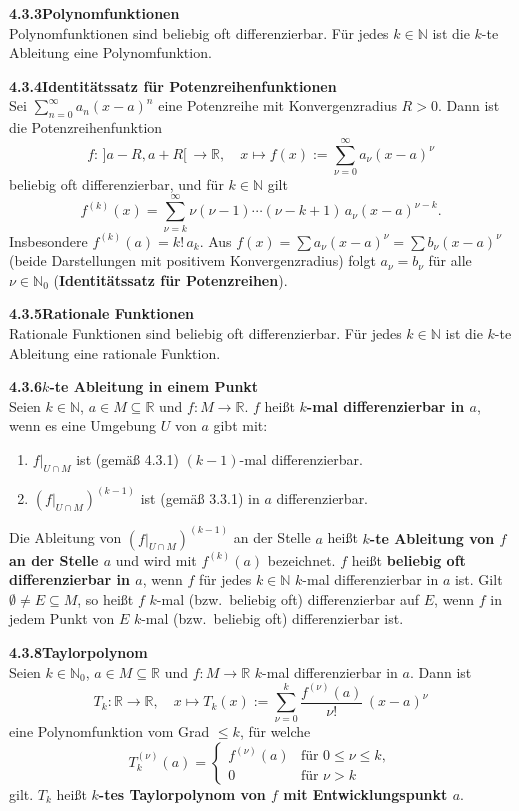 \documentclass[a4paper,12pt]{article}
\newcommand{\gentry}[3]{%
  \noindent\textbf{#1\quad #2}\nopagebreak\\[0.2em]
  #3\par\smallskip
}
\begin{document}
\gentry{4.3.3}{Polynomfunktionen}{%
  Polynomfunktionen sind beliebig oft differenzierbar. Für jedes $k \in \mathbb{N}$ ist die
  $k$-te Ableitung eine Polynomfunktion.
}

\gentry{4.3.4}{Identitätssatz für Potenzreihenfunktionen}{%
  Sei $\sum_{n=0}^{\infty} a_n (x-a)^n$ eine Potenzreihe mit Konvergenzradius $R > 0$. Dann
  ist die Potenzreihenfunktion
  \[
    f: \,]a-R, a+R[\, \to \mathbb{R}, \quad x \mapsto f(x) := \sum_{\nu=0}^{\infty} a_\nu (x-a)^\nu
  \]
  beliebig oft differenzierbar, und für $k \in \mathbb{N}$ gilt
  \[
    f^{(k)}(x) = \sum_{\nu = k}^{\infty} \nu(\nu-1)\cdots(\nu-k+1)\, a_\nu (x-a)^{\nu-k}.
  \]
  Insbesondere $f^{(k)}(a) = k!\,a_k$. Aus $f(x) = \sum a_\nu (x-a)^\nu = \sum b_\nu (x-a)^\nu$
  (beide Darstellungen mit positivem Konvergenzradius) folgt $a_\nu = b_\nu$ für alle
  $\nu \in \mathbb{N}_0$ (\textbf{Identitätssatz für Potenzreihen}).
}

\gentry{4.3.5}{Rationale Funktionen}{%
  Rationale Funktionen sind beliebig oft differenzierbar. Für jedes $k \in \mathbb{N}$ ist
  die $k$-te Ableitung eine rationale Funktion.
}

\gentry{4.3.6}{$k$-te Ableitung in einem Punkt}{%
  Seien $k \in \mathbb{N}$, $a \in M \subseteq \mathbb{R}$ und $f: M \to \mathbb{R}$.
  $f$ heißt \textbf{$k$-mal differenzierbar in $a$}, wenn es eine Umgebung $U$ von $a$ gibt mit:
  \begin{enumerate}[label=(\roman*),topsep=2pt,itemsep=1pt]
    \item $f|_{U \cap M}$ ist (gemäß 4.3.1) $(k-1)$-mal differenzierbar.
    \item $(f|_{U \cap M})^{(k-1)}$ ist (gemäß 3.3.1) in $a$ differenzierbar.
  \end{enumerate}
  Die Ableitung von $(f|_{U \cap M})^{(k-1)}$ an der Stelle $a$ heißt \textbf{$k$-te Ableitung
  von $f$ an der Stelle $a$} und wird mit $f^{(k)}(a)$ bezeichnet.
  $f$ heißt \textbf{beliebig oft differenzierbar in $a$}, wenn $f$ für jedes $k \in \mathbb{N}$
  $k$-mal differenzierbar in $a$ ist. Gilt $\emptyset \neq E \subseteq M$, so heißt $f$
  $k$-mal (bzw.\ beliebig oft) differenzierbar auf $E$, wenn $f$ in jedem Punkt von $E$ $k$-mal
  (bzw.\ beliebig oft) differenzierbar ist.
}

\gentry{4.3.8}{Taylorpolynom}{%
  Seien $k \in \mathbb{N}_0$, $a \in M \subseteq \mathbb{R}$ und $f: M \to \mathbb{R}$ $k$-mal
  differenzierbar in $a$. Dann ist
  \[
    T_k: \mathbb{R} \to \mathbb{R}, \quad x \mapsto T_k(x) := \sum_{\nu=0}^{k} \frac{f^{(\nu)}(a)}{\nu!}\,(x-a)^\nu
  \]
  eine Polynomfunktion vom Grad $\leq k$, für welche
  \[
    T_k^{(\nu)}(a) = \begin{cases} f^{(\nu)}(a) & \text{für } 0 \leq \nu \leq k, \\ 0 & \text{für } \nu > k \end{cases}
  \]
  gilt. $T_k$ heißt \textbf{$k$-tes Taylorpolynom von $f$ mit Entwicklungspunkt $a$}.
}
\end{document}
